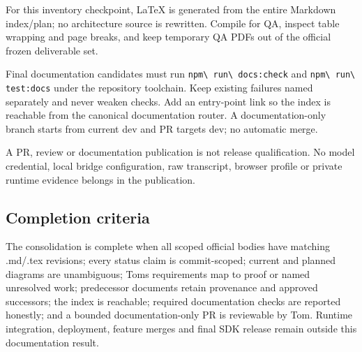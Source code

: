 \documentclass[
  11pt,
]{article}
\begin{document}
For this inventory checkpoint, LaTeX is generated from the entire
Markdown index/plan; no architecture source is rewritten. Compile for
QA, inspect table wrapping and page breaks, and keep temporary QA PDFs
out of the official frozen deliverable set.

Final documentation candidates must run \nolinkurl{npm\ run\ docs:check}
and \nolinkurl{npm\ run\ test:docs} under the repository toolchain. Keep
existing failures named separately and never weaken checks. Add an
entry-point link so the index is reachable from the canonical
documentation router. A documentation-only branch starts from current
dev and PR targets dev; no automatic merge.

A PR, review or documentation publication is not release qualification.
No model credential, local bridge configuration, raw transcript, browser
profile or private runtime evidence belongs in the publication.

\hypertarget{completion-criteria}{%
\subsection{Completion criteria}\label{completion-criteria}}

The consolidation is complete when all scoped official bodies have
matching .md/.tex revisions; every status claim is commit-scoped;
current and planned diagrams are unambiguous; Tom\textquotesingle s
requirements map to proof or named unresolved work; predecessor
documents retain provenance and approved successors; the index is
reachable; required documentation checks are reported honestly; and a
bounded documentation-only PR is reviewable by Tom. Runtime integration,
deployment, feature merges and final SDK release remain outside this
documentation result.
\end{document}
